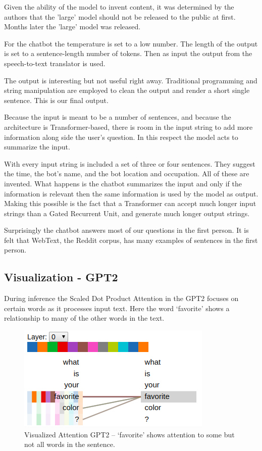 Given the ability of the model to invent content, it was determined by the authors that the 'large' model should not be released to the public at first. Months later the 'large' model was released. 

For the chatbot the temperature is set to a low number. The length of the output is set to a sentence-length number of tokens. Then as input the output from the speech-to-text translator is used.

The output is interesting but not useful right away. Traditional programming and string manipulation are employed to clean the output and render a short single sentence. This is our final output.

Because the input is meant to be a number of sentences, and because the architecture is Transformer-based, there is room in the input string to add more information along side the user's question. In this respect the model acts to summarize the input. 

With every input string is included a set of three or four sentences. They suggest the time, the bot's name, and the bot location and occupation. All of these are invented. What happens is the chatbot summarizes the input and only if the information is relevant then the same information is used by the model as output. Making this possible is the fact that a Transformer can accept much longer input strings than a Gated Recurrent Unit, and generate much longer output strings.

Surprisingly the chatbot answers most of our questions in the first person. It is felt that WebText, the Reddit corpus, has many examples of sentences in the first person.

\subsection{Visualization - GPT2}

During inference the Scaled Dot Product Attention in the GPT2 focuses on certain words as it processes input text. Here the word `favorite' shows a relationship to many of the other words in the text.  

\begin{figure}[H]
	\begin{center}
		\includegraphics[scale=2]{Figure_4}
		
		
	\end{center}
	\caption[Visualized Attention GPT2]{Visualized Attention GPT2 -- `favorite' shows attention to some but not all words in the sentence.}
	\label{diagram-vis04}
	
\end{figure}


